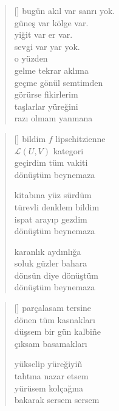 \documentclass[10pt, openright, twoside]{memoir}
\theoremstyle{definition}
\begin{document}
\vspace*{\fill}
%
\newpage
{}
\vspace*{\fill}
\settowidth{\versewidth}{bugün akıl var sanrı yok.}
\begin{verse}[\versewidth]
  bugün akıl var sanrı yok. \\
  güneş var kölge var. \\
  yiğit var er var. \\
  sevgi var yar yok. \\
  o yüzden  \\
  gelme tekrar aklıma \\
  geçme gönül semtimden \\
  görürse fikirlerim \\
  taşlarlar yüreğini \\
  razı olmam yanmana
\end{verse}
\vspace*{\fill}
%
\newpage
{}
\vspace*{\fill}
\begin{verse}[\versewidth]
  bildim $f$ lipschitzienne \\
  $\mathcal{L}(U, V)$ kategori \\
  geçirdim tüm vakiti \\
  dönüştüm beynemaza

  kitabına yüz sürdüm \\
  türevli denklem bildim \\
  ispat arayıp gezdim \\
  dönüştüm beynemaza

  karanlık aydınlığa \\
  soluk güzler bahara \\
  dönsün diye dönüştüm \\
  dönüştüm beynemaza
\end{verse}
\vspace*{\fill}
%
\newpage
{}
\vspace*{\fill}
\settowidth{\versewidth}{düşsem bir gün kalbi\~ne}
\begin{verse}[\versewidth]
  parçalasam tersine \\
  dönen tüm kasnakları \\
  düşsem bir gün kalbi\~ne \\
  çıksam basamakları

  yükselip yüreğiyi\~n \\
  tahtına nazar etsem \\
  yürüsem kolçağına \\
  bakarak sersem sersem
\end{verse}
\end{document}

